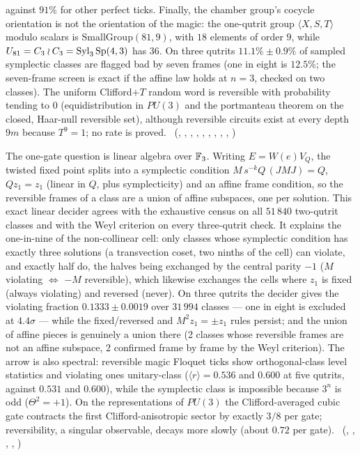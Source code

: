 against $91\%$ for other perfect ticks. Finally, the chamber group's cocycle orientation is not the orientation of the
magic: the one-qutrit group $\langle X,S,T\rangle$ modulo scalars is $\mathrm{SmallGroup}(81,9)$, with $18$ elements of order
$9$, while $U_{81}=C_3\wr C_3=\mathrm{Syl}_3\,\mathrm{Sp}(4,3)$ has $36$. On three qutrits $11.1\%\pm0.9\%$ of sampled symplectic classes are flagged bad by seven frames (one in eight is $12.5\%$; the seven-frame screen is exact if the affine law holds at $n=3$, checked on two classes). The uniform
Clifford$+T$ random word is reversible with probability tending to $0$ (equidistribution in $PU(3)$ and the portmanteau
theorem on the closed, Haar-null reversible set), although reversible circuits exist at every depth $9m$ because
$T^9=1$; no rate is proved. \tierC\ (,
, ,
, ,
, ,
, ,
)

The one-gate question is linear algebra over $\mathbb{F}_3$. Writing $E=W(e)V_Q$, the twisted fixed point splits into a
symplectic condition $M\,s^{-k}Q\,(JMJ)=Q$, $Qz_1=z_1$ (linear in $Q$, plus symplecticity) and an affine frame
condition, so the reversible frames of a class are a union of affine subspaces, one per solution. This exact linear
decider agrees with the exhaustive census on all $51\,840$ two-qutrit classes and with the Weyl criterion on every
three-qutrit check. It explains the one-in-nine of the non-collinear cell: only classes whose symplectic condition has
exactly three solutions (a transvection coset, two ninths of the cell) can violate, and exactly half do, the halves
being exchanged by the central parity $-1$ ($M$ violating $\Leftrightarrow$ $-M$ reversible), which likewise exchanges
the cells where $z_1$ is fixed (always violating) and reversed (never). On three qutrits the decider gives the
violating fraction $0.1333\pm0.0019$ over $31\,994$
classes --- one in eight is excluded at $4.4\sigma$ --- while the fixed/reversed and
$M^2z_1=\pm z_1$ rules persist; and the union of affine pieces is genuinely a union there (2 classes whose
reversible frames are not an affine subspace, 2 confirmed frame by frame by the Weyl criterion).
The arrow is also spectral: reversible magic Floquet ticks show orthogonal-class level statistics and violating ones
unitary-class ($\langle r\rangle=0.536$ and $0.600$ at five qutrits, against $0.531$ and $0.600$), while the symplectic
class is impossible because $3^n$ is odd ($\Theta^2=+1$). On the representations of $PU(3)$ the Clifford-averaged cubic
gate contracts the first Clifford-anisotropic sector by exactly $3/8$ per gate; reversibility, a singular observable,
decays more slowly (about $0.72$ per gate). \tierC\ (,
, ,
, )

